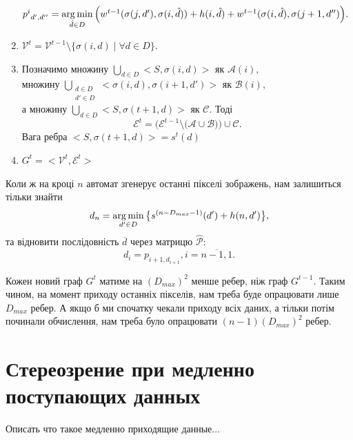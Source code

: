 \begin{enumerate}
		$ {p^i}_{d',d''} = \operatorname*{arg\,min}\limits_{\hat{d} \in D} 
		\Big( w^{t-1}(\sigma(j, d'), \sigma(i,\hat{d})) +  h(i, \hat{d}) +  w^{t-1}(\sigma(i, \hat{d}), \sigma(j+1, d'') \Big). $  \\
	\item 
		$\mathcal{V}^t = \mathcal{V}^{t-1} \setminus \{ \sigma(i, d) \; | \; \forall d \in D \}.$\\
	\item %
		Позначимо множину $ \bigcup\limits_{d \in D} <S, \sigma(i, d) > $ як $ \mathcal{A}(i),$ \\
		множину $ \bigcup\limits_{\substack{d \in D \\ d' \in D}} <\sigma(i, d), \sigma(i+1, d') > $ як $ \mathcal{B}(i),$ \\
		а множину $ \bigcup\limits_{d \in D} <S, \sigma(t+1, d) > $ як $ \mathcal{C}. $ Тоді 
		$$\mathcal{E}^t = \Big( \mathcal{E}^{t-1} \setminus \big( \mathcal{A} \cup \mathcal{B} \big) \Big) \cup \mathcal{C}.$$
		Вага ребра $ <S, \sigma(t+1, d) > = s^t(d)$ %
	\item 
		$G^t = <\mathcal{V}^t, \mathcal{E}^t> $ \\
\end{enumerate}

Коли ж на кроці $ n $ автомат згенерує останні пікселі зображень, нам залишиться тільки знайти
$$ d_n = \operatorname*{arg\,min}\limits_{d' \in D} \big\{ { s^{(n-D_{max}-1)}(d') + h(n, d') } \big\},$$
та відновити послідовність $\overline{d}$ через матрицю $\hat{\mathcal{P}}$:
$$ d_i = p_{i+1,d_{i+1}}, i = \overline{n-1, 1}. $$

Кожен новий граф $G^t$ матиме на $(D_{max})^2$ менше ребер, ніж граф $G^{t-1}$. Таким чином, на момент приходу останніх пікселів, нам треба буде опрацювати лише $D_{max}$ ребер. А якщо б ми спочатку чекали приходу всіх даних, а тільки потім починали обчислення, нам треба було опрацювати 
$(n-1)(D_{max})^2$ ребер.










\section{Стереозрение при медленно поступающих данных}
Описать что такое медленно приходящие данные...

